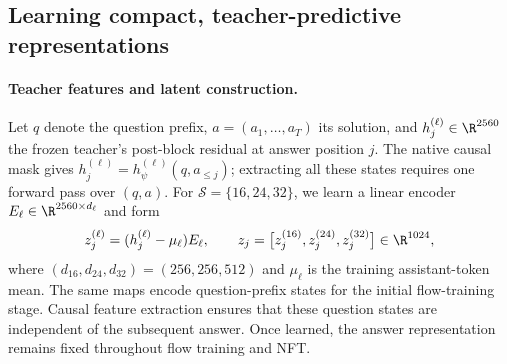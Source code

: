 

\subsection{Learning compact, teacher-predictive representations}
\label{sec:representationconstruction}

\paragraph{Teacher features and latent construction.}
Let $q$ denote the question prefix, $a=(a_1,\ldots,a_T)$ its solution, and $h_j^{(\ell)}\in\R^{2560}$ the frozen teacher's post-block residual at answer position $j$. The native causal mask gives $h_j^{(\ell)}=h_\psi^{(\ell)}(q,a_{\leq j})$; extracting all these states requires one forward pass over $(q,a)$. For $\mathcal S=\{16,24,32\}$, we learn a linear encoder $E_\ell\in\R^{2560\times d_\ell}$ and form
\begin{equation}
 z_j^{(\ell)}=(h_j^{(\ell)}-\mu_\ell)E_\ell,
 \qquad
 z_j=\big[z_j^{(16)},z_j^{(24)},z_j^{(32)}\big]\in\R^{1024},
 \label{eq:representationencoding}
\end{equation}
where $(d_{16},d_{24},d_{32})=(256,256,512)$ and $\mu_\ell$ is the training assistant-token mean. The same maps encode question-prefix states for the initial flow-training stage. Causal feature extraction ensures that these question states are independent of the subsequent answer. Once learned, the answer representation remains fixed throughout flow training and NFT.

